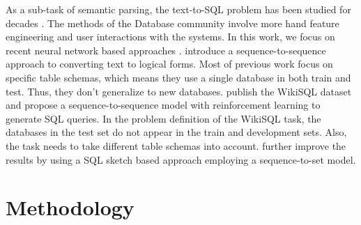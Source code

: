 \documentclass[11pt,a4paper]{article}
\begin{document}
As a sub-task of semantic parsing, the text-to-SQL problem has been studied for decades \cite{warren1982efficient,popescu2003towards,popescu2004modern,li2006constructing,giordani2012translating,wang2017synthesizing}. The methods of the Database community \cite{li2014constructing, Yaghmazadeh17} involve more hand feature engineering and user interactions with the systems. In this work, we focus on recent neural network based approaches \cite{Yin15,Zhong2017,Xu2017,Wang2017,iyer17}.  introduce a sequence-to-sequence approach to converting text to logical forms. Most of previous work focus on specific table schemas, which means they use a single database in both train and test. Thus, they don't generalize to new databases.
 publish the WikiSQL dataset and propose a sequence-to-sequence model with reinforcement learning to generate SQL queries. In the problem definition of the WikiSQL task, the databases in the test set do not appear in the train and development sets. Also, the task needs to take different table schemas into account.  further improve the results by using a SQL sketch based approach employing a sequence-to-set model.

\section{Methodology}
\label{sec:methods}
\end{document}
